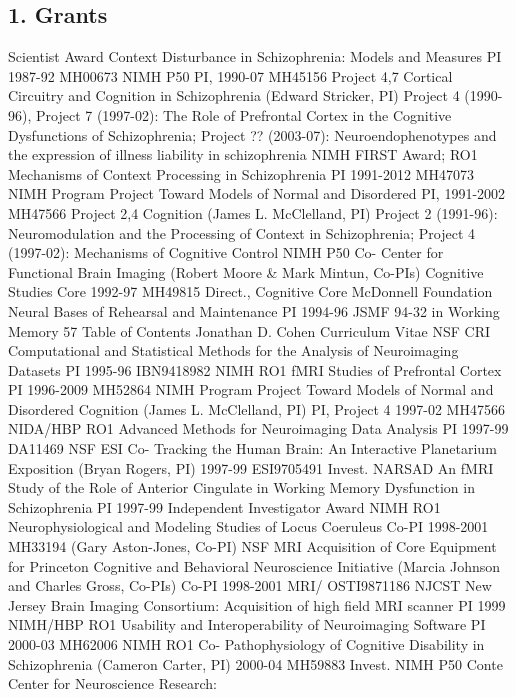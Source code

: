 \documentclass[10 pt]{article}
\begin{document}
\subsection*{1. Grants} \label{secRAPA1}

 Scientist Award Context Disturbance in Schizophrenia: Models and Measures
PI 1987-92 MH00673
NIMH P50 PI,
1990-07 MH45156
Project 4,7
Cortical Circuitry and Cognition in Schizophrenia (Edward Stricker, PI) Project 4 (1990-96), Project 7 (1997-02): The Role of Prefrontal Cortex in the Cognitive Dysfunctions of Schizophrenia; Project ?? (2003-07): Neuroendophenotypes and the expression of illness liability in schizophrenia
NIMH FIRST
Award; RO1 Mechanisms of Context Processing in Schizophrenia
PI 1991-2012 MH47073
NIMH Program Project
Toward Models of Normal and Disordered
PI,
1991-2002 MH47566
Project 2,4
Cognition (James L. McClelland, PI) Project 2 (1991-96): Neuromodulation and the Processing of Context in Schizophrenia; Project 4 (1997-02): Mechanisms of Cognitive Control
NIMH P50 Co-
Center for Functional Brain Imaging (Robert Moore & Mark Mintun, Co-PIs) Cognitive Studies Core
1992-97 MH49815
Direct.,
Cognitive Core
McDonnell
Foundation
Neural Bases of Rehearsal and Maintenance
PI 1994-96 JSMF 94-32
in Working Memory
57 Table of Contents
Jonathan D. Cohen Curriculum Vitae
NSF CRI Computational and Statistical Methods for the Analysis of Neuroimaging Datasets
PI 1995-96 IBN9418982
NIMH RO1 fMRI Studies of Prefrontal Cortex PI 1996-2009 MH52864
NIMH Program Project
Toward Models of Normal and Disordered
Cognition (James L. McClelland, PI)
PI,
Project 4
1997-02 MH47566
NIDA/HBP RO1 Advanced Methods for Neuroimaging Data Analysis
PI 1997-99 DA11469
NSF ESI Co-
Tracking the Human Brain: An Interactive Planetarium Exposition (Bryan Rogers, PI)
1997-99 ESI9705491
Invest.
NARSAD
An fMRI Study of the Role of Anterior Cingulate in Working Memory Dysfunction in Schizophrenia
PI 1997-99
Independent Investigator Award
NIMH RO1 Neurophysiological and Modeling Studies of Locus Coeruleus
Co-PI 1998-2001 MH33194
(Gary Aston-Jones, Co-PI)
NSF MRI Acquisition of Core Equipment for Princeton Cognitive and Behavioral Neuroscience Initiative (Marcia Johnson and Charles Gross, Co-PIs)
Co-PI 1998-2001 MRI/
OSTI9871186
NJCST New Jersey Brain Imaging Consortium: Acquisition of high field MRI scanner
PI 1999
NIMH/HBP RO1 Usability and Interoperability of Neuroimaging Software
PI 2000-03 MH62006
NIMH RO1 Co-
Pathophysiology of Cognitive Disability in Schizophrenia (Cameron Carter, PI)
2000-04 MH59883
Invest.
NIMH P50 Conte Center for Neuroscience Research:
\end{document}

